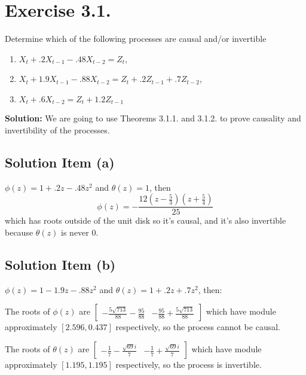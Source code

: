 \section*{Exercise 3.1.}

Determine which of the following processes are causal and/or invertible

\begin{enumerate}[label = (\alph*)]
    \item $X_t + .2 X_{t-1} - .48 X_{t-2} = Z_t$,
    \item $X_t + 1.9 X_{t-1} - .88 X_{t-2} = Z_t + .2 Z_{t-1} + .7Z_{t-2}$,
    \item $X_t + .6 X_{t-2} = Z_t + 1.2 Z_{t-1}$
\end{enumerate}

\textbf{Solution:} We are going to use Theorems 3.1.1. and 3.1.2. to prove causality and invertibility of the processes.

\subsection*{Solution Item (a)}

$\phi(z) = 1+.2z-.48z^2$ and $\theta(z) = 1$, then
\[\phi(z) = - \frac{12 \left(z - \frac{5}{3}\right) \left(z + \frac{5}{4}\right)}{25} \]
which has roots outside of the unit disk so it's causal, and it's also invertible because $\theta(z)$ is never 0.

\subsection*{Solution Item (b)}

$\phi(z) = 1-1.9z-.88z^2$ and $\theta(z) = 1+.2 z + .7 z^2$, then:

The roots of $\phi(z)$ are $\left[\begin{matrix}- \frac{5 \sqrt{713}}{88} - \frac{95}{88} & - \frac{95}{88} + \frac{5 \sqrt{713}}{88}\end{matrix}\right]$ which have module approximately $[2.596, 0.437]$ respectively, so the process cannot be causal.

The roots of $\theta(z)$ are $\left[\begin{matrix}- \frac{1}{7} - \frac{\sqrt{69} i}{7} & - \frac{1}{7} + \frac{\sqrt{69} i}{7}\end{matrix}\right]
$ which have module approximately $[1.195, 1.195]$ respectively, so the process is invertible.

